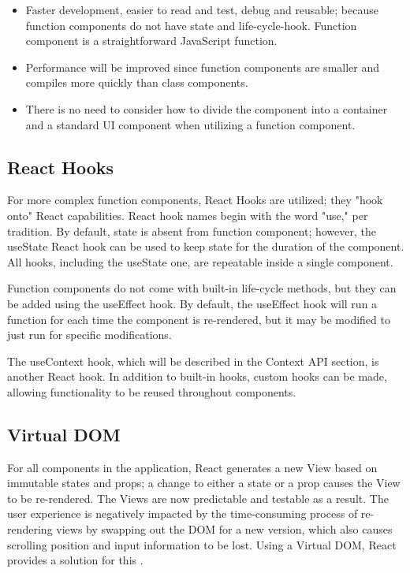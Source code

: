 \begin{itemize}
  \item Faster development, easier to read and test, debug and reusable; because function components do not have state and life-cycle-hook. Function component is a straightforward JavaScript function.
  \item Performance will be improved since function components are smaller and compiles more quickly than class components.
  \item There is no need to consider how to divide the component into a container and a standard UI component when utilizing a function component.
\end{itemize}

\subsection{React Hooks}

For more complex function components, React Hooks are utilized; they "hook onto" React capabilities. React hook names begin with the word "use," per tradition. By default, state is absent from function component; however, the useState React hook can be used to keep state for the duration of the component. All hooks, including the useState one, are repeatable inside a single component.

Function components do not come with built-in life-cycle methods, but they can be added using the useEffect hook. By default, the useEffect hook will run a function for each time the component is re-rendered, but it may be modified to just run for specific modifications.

The useContext hook, which will be described in the Context API section, is another React hook. In addition to built-in hooks, custom hooks can be made, allowing functionality to be reused throughout components.

\subsection{Virtual DOM}

For all components in the application, React generates a new View based on immutable states and props; a change to either a state or a prop causes the View to be re-rendered. The Views are now predictable and testable as a result. The user experience is negatively impacted by the time-consuming process of re-rendering views by swapping out the DOM for a new version, which also causes scrolling position and input information to be lost. Using a Virtual DOM, React provides a solution for this \autocite{david2020building}.

